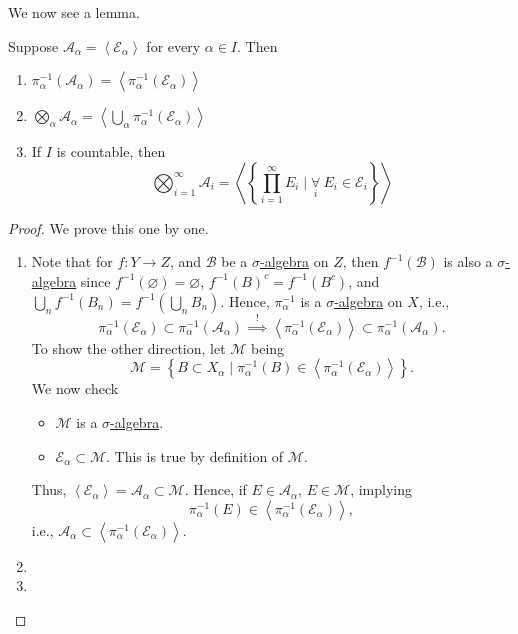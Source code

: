 We now see a lemma.
\begin{lemma}
	Suppose \(\mathcal{A} _\alpha  = \left< \mathcal{E} _\alpha  \right> \) for every \(\alpha \in I\). Then
	\begin{enumerate}[(1)]
		\item \(\pi _\alpha ^{-1} (\mathcal{A} _\alpha ) = \left< \pi ^{-1} _\alpha (\mathcal{E} _\alpha ) \right> \)
		\item \(\bigotimes_\alpha  \mathcal{A} _\alpha = \left< \bigcup_{\alpha} \pi _\alpha ^{-1} (\mathcal{E} _\alpha )\right> \)
		\item If \(I\) is countable, then
		      \[
			      \bigotimes_{i=1}^{\infty }\mathcal{A} _i = \left< \left\{\prod_{i=1}^{\infty} E_{i} \mid \underset{i}{\forall}\ E_{i}\in \mathcal{E} _{i}\right\} \right>
		      \]
	\end{enumerate}
\end{lemma}
\begin{proof}
	We prove this one by one.
	\begin{enumerate}[(1)]
		\item Note that for \(f\colon Y\to Z\), and \(\mathcal{B} \) be a \hyperref[def:sigma-algebra]{\(\sigma\)-algebra} on \(Z\), then
		      \(f^{-1} (\mathcal{B} )\) is also a \hyperref[def:sigma-algebra]{\(\sigma\)-algebra} since
		      \(f^{-1} (\varnothing ) = \varnothing\), \(f^{-1} (B)^{c} = f^{-1} (B^{c} )\), and \(\bigcup_{n} f^{-1} (B_{n}) = f^{-1} (\bigcup_{n}B_{n})\).
		      Hence, \(\pi ^{-1}_\alpha \) is a \hyperref[def:sigma-algebra]{\(\sigma\)-algebra} on \(X\), i.e.,
		      \[
			      \pi _\alpha ^{-1} (\mathcal{E} _\alpha )\subset \pi _\alpha ^{-1} (\mathcal{A} _\alpha )\overset{\hyperref[lma:lec2-1]{!}}{\implies} \left< \pi ^{-1} _\alpha (\mathcal{E} _\alpha ) \right> \subset \pi _\alpha ^{-1} (\mathcal{A} _\alpha ).
		      \]
		      To show the other direction, let \(\mathcal{M} \) being
		      \[
			      \mathcal{M} = \left\{B\subset X_\alpha  \mid \pi _\alpha ^{-1} (B)\in \left< \pi _\alpha ^{-1} (\mathcal{E} _\alpha ) \right> \right\}.
		      \]
		      We now check
		      \begin{itemize}
			      \item \(\mathcal{M} \) is a \hyperref[def:sigma-algebra]{\(\sigma\)-algebra}. 
			      \item \(\mathcal{E} _\alpha \subset \mathcal{M}\). This is true by definition of \(\mathcal{M} \).
		      \end{itemize}
		      Thus, \(\left< \mathcal{E} _\alpha \right> = \mathcal{A} _\alpha \subset \mathcal{M} \). Hence,
		      if \(E\in \mathcal{A} _\alpha \), \(E\in \mathcal{M} \), implying
		      \[
			      \pi _\alpha ^{-1} (E)\in \left< \pi _\alpha ^{-1} (\mathcal{E} _\alpha ) \right>,
		      \]
		      i.e., \(\mathcal{A} _\alpha \subset \left< \pi_\alpha ^{-1} (\mathcal{E} _\alpha ) \right> \).
		\item {}
		\item {}
	\end{enumerate}
\end{proof}

